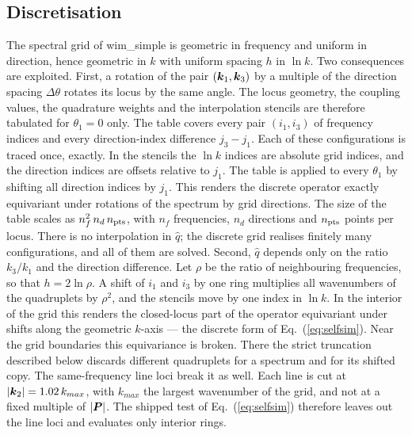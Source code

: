 \documentclass[12pt]{article}
\newcommand{\eq }  [1]{Eq.~(\ref{#1})}  %
\renewcommand{\v}[1]{{\mbox{\boldmath$ #1 $}}}  %
\begin{document}
\subsection*{Discretisation}

The spectral grid of wim\_simple is geometric in frequency and uniform in
direction, hence geometric in $k$ with uniform spacing $h$ in $\ln k$.
Two consequences are exploited.
First, a rotation of the pair $(\v k_1, \v k_3)$ by a multiple of the
direction spacing $\Delta\theta$ rotates its locus by the same angle.
The locus geometry, the coupling values, the quadrature weights and the
interpolation stencils are therefore tabulated for $\theta_1 = 0$ only.
The table covers every pair $(i_1, i_3)$ of frequency indices and every
direction-index difference $j_3 - j_1$.
Each of these configurations is traced once, exactly.
In the stencils the $\ln k$ indices are absolute grid indices, and the
direction indices are offsets relative to $j_1$.
The table is applied to every $\theta_1$ by shifting all direction indices
by $j_1$.
This renders the discrete operator exactly equivariant under rotations of
the spectrum by grid directions.
The size of the table scales as $n_f^2\, n_d\, n_{\rm pts}$, with $n_f$
frequencies, $n_d$ directions and $n_{\rm pts}$ points per locus.
There is no interpolation in $\hat q$; the discrete grid realises finitely
many configurations, and all of them are solved.
Second, $\hat q$ depends only on the ratio $k_3/k_1$ and the direction
difference.
Let $\rho$ be the ratio of neighbouring frequencies, so that $h = 2\ln\rho$.
A shift of $i_1$ and $i_3$ by one ring multiplies all wavenumbers of the
quadruplets by $\rho^2$, and the stencils move by one index in $\ln k$.
In the interior of the grid this renders the closed-locus part of the
operator equivariant under shifts along the geometric $k$-axis
--- the discrete form of \eq{eq:selfsim}.
Near the grid boundaries this equivariance is broken.
There the strict truncation described below discards different quadruplets
for a spectrum and for its shifted copy.
The same-frequency line loci break it as well.
Each line is cut at $|\v k_2| = 1.02\, k_{max}$, with $k_{max}$ the largest
wavenumber of the grid, and not at a fixed multiple of $|\v P|$.
The shipped test of \eq{eq:selfsim} therefore leaves out the line loci and
evaluates only interior rings.
\end{document}
